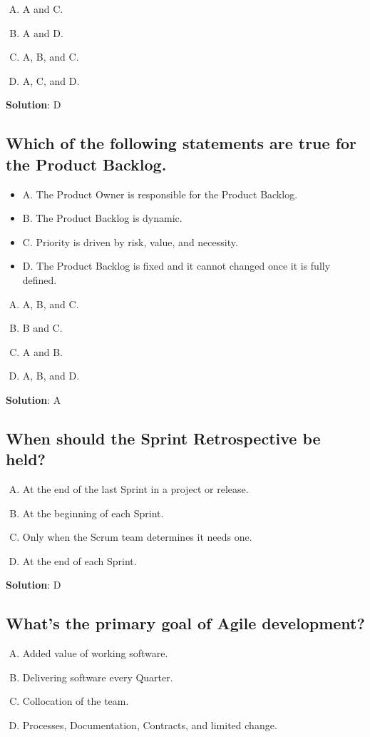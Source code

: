 \begin{enumerate}[A)]
  \item A and C.
  \item A and D.
  \item A, B, and C.
  \item A, C, and D.
\end{enumerate}


\textbf{Solution}: D


\subsection{Which of the following statements are true for the Product Backlog.}
\begin{itemize}
  \item A. The Product Owner is responsible for the Product Backlog.
  \item B. The Product Backlog is dynamic.
  \item C. Priority is driven by risk, value, and necessity.
  \item D. The Product Backlog is fixed and it cannot changed once it is fully defined.
\end{itemize}


\begin{enumerate}[A)]
  \item A, B, and C.
  \item B and C.
  \item A and B.
  \item A, B, and D.
\end{enumerate}


\textbf{Solution}: A


\subsection{When should the Sprint Retrospective be held?}
\begin{enumerate}[A)]
  \item At the end of the last Sprint in a project or release.
  \item At the beginning of each Sprint.
  \item Only when the Scrum team determines it needs one.
  \item At the end of each Sprint.
\end{enumerate}


\textbf{Solution}: D


\subsection{What's the primary goal of Agile development?}
\begin{enumerate}[A)]
  \item Added value of working software.
  \item Delivering software every Quarter.
  \item Collocation of the team.
  \item Processes, Documentation, Contracts, and limited change.
\end{enumerate}


